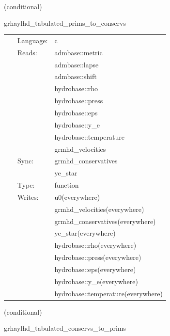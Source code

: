 \vspace{5mm}

   (conditional) 

\hspace{5mm} grhaylhd\_tabulated\_prims\_to\_conservs 

\hspace{5mm}{\it tabulated version of grhaylhd\_prims\_to\_conservs } 


\hspace{5mm}

 \begin{tabular*}{160mm}{cll} 
~ & Language:  & c \\ 
~ & Reads:  & admbase::metric \\ 
~& ~ &admbase::lapse\\ 
~& ~ &admbase::shift\\ 
~& ~ &hydrobase::rho\\ 
~& ~ &hydrobase::press\\ 
~& ~ &hydrobase::eps\\ 
~& ~ &hydrobase::y\_e\\ 
~& ~ &hydrobase::temperature\\ 
~& ~ &grmhd\_velocities\\ 
~ & Sync:  & grmhd\_conservatives \\ 
~& ~ &ye\_star\\ 
~ & Type:  & function \\ 
~ & Writes:  & u0(everywhere) \\ 
~& ~ &grmhd\_velocities(everywhere)\\ 
~& ~ &grmhd\_conservatives(everywhere)\\ 
~& ~ &ye\_star(everywhere)\\ 
~& ~ &hydrobase::rho(everywhere)\\ 
~& ~ &hydrobase::press(everywhere)\\ 
~& ~ &hydrobase::eps(everywhere)\\ 
~& ~ &hydrobase::y\_e(everywhere)\\ 
~& ~ &hydrobase::temperature(everywhere)\\ 
\end{tabular*} 


\vspace{5mm}

   (conditional) 

\hspace{5mm} grhaylhd\_tabulated\_conservs\_to\_prims 

